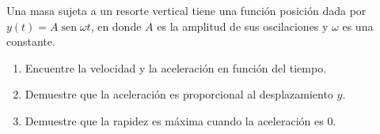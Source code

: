 \setcounter{enumi}{40}
\item Una masa sujeta a un resorte vertical tiene una función posición dada por $y(t) = A \operatorname{sen} \omega t$, en donde $A$ es la amplitud de sus oscilaciones y $\omega$ es una constante.
\begin{enumerate}
    \item[(a)] Encuentre la velocidad y la aceleración en función del tiempo.
    \item[(b)] Demuestre que la aceleración es proporcional al desplazamiento $y$.
    \item[(c)] Demuestre que la rapidez es máxima cuando la aceleración es 0.
\end{enumerate}

